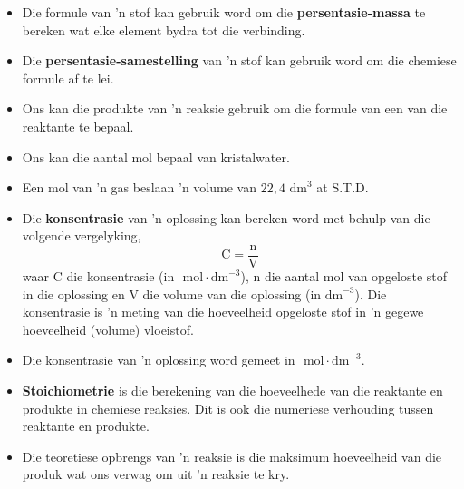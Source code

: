 \begin{itemize}[noitemsep]
\item Die formule van 'n stof kan gebruik word om die \textbf{persentasie-massa} te bereken wat elke element bydra tot die verbinding.
\item Die \textbf{persentasie-samestelling} van 'n stof kan gebruik word om die chemiese formule af te lei.
\item Ons kan die produkte van 'n reaksie gebruik om die formule van een van die reaktante te bepaal.
\item Ons kan die aantal mol bepaal van kristalwater.
\item Een mol van 'n gas beslaan 'n volume van $22,4 {\text{ dm}}^{3}$ at S.T.D.
\item Die \textbf{konsentrasie} van 'n oplossing kan bereken word met behulp van die volgende vergelyking,
\label{m38712*id286019}\nopagebreak\noindent{}
    \begin{equation*}
    \text{C}=\frac{\text{n}}{\text{V}}
      \end{equation*}
waar C die konsentrasie (in $\text{ mol} \cdot {\text{dm}}^{-3}$), n die aantal mol van opgeloste stof in die oplossing en V die volume van die oplossing (in ${\text{dm}}^{-3}$). Die konsentrasie is 'n meting van die hoeveelheid opgeloste stof in 'n gegewe hoeveelheid (volume) vloeistof.
\item Die konsentrasie van 'n oplossing word gemeet in $\text{ mol} \cdot {\text{dm}}^{-3}$.
\item \textbf{Stoichiometrie} is die berekening van die hoeveelhede van die reaktante en produkte in  chemiese reaksies. Dit is ook die numeriese verhouding tussen reaktante en produkte.
\item Die teoretiese opbrengs van 'n reaksie is die maksimum hoeveelheid van die produk wat ons verwag om uit 'n reaksie te kry.\end{itemize}
\label{m38712*secfhsst!!!underscore!!!id2334}
